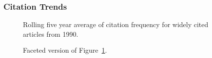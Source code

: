 \documentclass[
  10pt,
  letterpaper,
  DIV=11,
  numbers=noendperiod,
  twoside]{scrartcl}
\begin{document}
\subsubsection*{Citation Trends}\label{sec-trends-1990}

\begin{figure}


\caption{\label{fig-citation-spaghetti-1990}Rolling five year average of
citation frequency for widely cited articles from 1990.}

\end{figure}%

\begin{figure}


\caption{\label{fig-citation-facet-1990}Faceted version of
Figure~\ref{fig-citation-spaghetti-1990}.}

\end{figure}%
\end{document}
